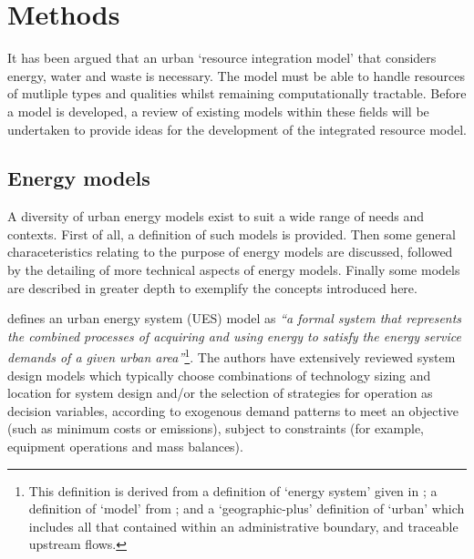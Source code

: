 \section{Methods} \label{sec:methods}
It has been argued that an urban `resource integration model' that considers energy, water and waste is necessary. The model must be able to handle resources of mutliple types and qualities whilst remaining computationally tractable. Before a model is developed, a review of existing models within these fields will be undertaken to provide ideas for the development of the integrated resource model.

\subsection{Energy models} \label{sec:models_energy}
A diversity of urban energy models exist to suit a wide range of needs and contexts. First of all, a definition of such models is provided. Then some general characeteristics relating to the purpose of energy models are discussed, followed by the detailing of more technical aspects of energy models. Finally some models are described in greater depth to exemplify the concepts introduced here.

\citet{Keirstead2012b} defines an urban energy system (UES) model as \emph{``a formal system that represents the combined processes of acquiring and using energy to satisfy the energy service demands of a given urban area''}\footnote{This definition is derived from a definition of `energy system' given in \citet{Jaccard2005}; a definition of `model' from \citet{Rosen2001}; and a `geographic-plus' definition of `urban' which includes all that contained within an administrative boundary, and traceable upstream flows.}. The authors have extensively reviewed system design models which typically choose combinations of technology sizing and location for system design and/or the selection of strategies for operation as decision variables, according to exogenous demand patterns to meet an objective (such as minimum costs or emissions), subject to constraints (for example, equipment operations and mass balances). 

